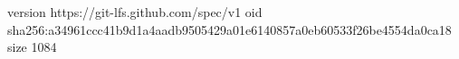 version https://git-lfs.github.com/spec/v1
oid sha256:a34961ccc41b9d1a4aadb9505429a01e6140857a0eb60533f26be4554da0ca18
size 1084
